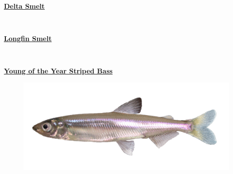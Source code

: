 \documentclass[
]{book}
\begin{document}
\begin{panel-grid}

\begin{columns-nocenter}

\begin{column800}

\textbf{\href{http://calfish.ucdavis.edu/species/?uid=47\&ds=698}{Delta Smelt}}

\end{column800}

\begin{column40}

~

\end{column40}

\begin{column800}

\textbf{\href{http://calfish.ucdavis.edu/species/?uid=87\&ds=698}{Longfin Smelt}}

\end{column800}

\begin{column40}

~

\end{column40}

\begin{column800}

\textbf{\href{http://calfish.ucdavis.edu/species/?uid=160\&ds=698}{Young of the Year Striped Bass}}

\end{column800}

\end{columns-nocenter}

\begin{columns-nocenter}

\begin{column800}

\begin{figure}

{\centering \includegraphics[width=29.17in]{figures/delta_smelt} 

}
\end{figure}
\end{column800}
\end{columns-nocenter}
\end{panel-grid}
\end{document}
